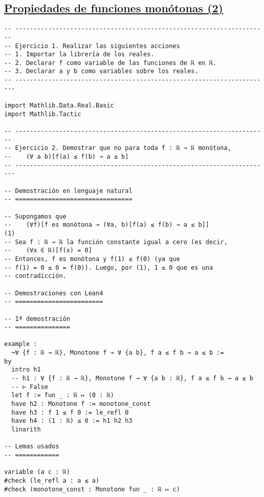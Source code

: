 \subsection{\href{./src/Logica/Propiedades\_de\_funciones\_monotonas\_2.lean}{Propiedades de funciones monótonas (2)}}
\label{sec:orgcf8592c}
\begin{verbatim}
-- ---------------------------------------------------------------------
-- Ejercicio 1. Realizar las siguientes acciones
-- 1. Importar la librería de los reales.
-- 2. Declarar f como variable de las funciones de ℝ en ℝ.
-- 3. Declarar a y b como variables sobre los reales.
-- ----------------------------------------------------------------------

import Mathlib.Data.Real.Basic
import Mathlib.Tactic

-- ---------------------------------------------------------------------
-- Ejercicio 2. Demostrar que no para toda f : ℝ → ℝ monótona,
--    (∀ a b)[f(a) ≤ f(b) → a ≤ b]
-- ----------------------------------------------------------------------

-- Demostración en lenguaje natural
-- ================================

-- Supongamos que
--    (∀f)[f es monótona → (∀a, b)[f(a) ≤ f(b) → a ≤ b]]             (1)
-- Sea f : ℝ → ℝ la función constante igual a cero (es decir,
--    (∀x ∈ ℝ)[f(x) = 0]
-- Entonces, f es monótona y f(1) ≤ f(0) (ya que
-- f(1) = 0 ≤ 0 = f(0)). Luego, por (1), 1 ≤ 0 que es una
-- contradicción.

-- Demostraciones con Lean4
-- ========================

-- 1ª demostración
-- ===============

example :
  ¬∀ {f : ℝ → ℝ}, Monotone f → ∀ {a b}, f a ≤ f b → a ≤ b :=
by
  intro h1
  -- h1 : ∀ {f : ℝ → ℝ}, Monotone f → ∀ {a b : ℝ}, f a ≤ f b → a ≤ b
  -- ⊢ False
  let f := fun _ : ℝ ↦ (0 : ℝ)
  have h2 : Monotone f := monotone_const
  have h3 : f 1 ≤ f 0 := le_refl 0
  have h4 : (1 : ℝ) ≤ 0 := h1 h2 h3
  linarith

-- Lemas usados
-- ============

variable (a c : ℝ)
#check (le_refl a : a ≤ a)
#check (monotone_const : Monotone fun _ : ℝ ↦ c)
\end{verbatim}

